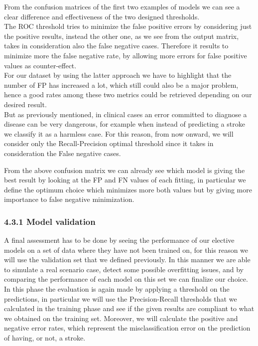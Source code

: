 \documentclass[
]{article}
\begin{document}
From the confusion matrices of the first two examples of models we can
see a clear difference and effectiveness of the two designed
thresholds.\\
The ROC threshold tries to minimize the false positive errors by
considering just the positive results, instead the other one, as we see
from the output matrix, takes in consideration also the false negative
cases. Therefore it results to minimize more the false negative rate, by
allowing more errors for false positive values as counter-effect.\\
For our dataset by using the latter approach we have to highlight that
the number of FP has increased a lot, which still could also be a major
problem, hence a good rates among these two metrics could be retrieved
depending on our desired result.\\
But as previously mentioned, in clinical cases an error committed to
diagnose a disease can be very dangerous, for example when instead of
predicting a stroke we classify it as a harmless case. For this reason,
from now onward, we will consider only the Recall-Precision optimal
threshold since it takes in consideration the False negative cases.

From the above confusion matrix we can already see which model is giving
the best result by looking at the FP and FN values of each fitting, in
particular we define the optimum choice which minimizes more both values
but by giving more importance to false negative minimization.

\hypertarget{model-validation}{%
\subsubsection{4.3.1 Model validation}\label{model-validation}}

A final assessment has to be done by seeing the performance of our
elective models on a set of data where they have not been trained on,
for this reason we will use the validation set that we defined
previously. In this manner we are able to simulate a real scenario case,
detect some possible overfitting issues, and by comparing the
performance of each model on this set we can finalize our choice.\\
In this phase the evaluation is again made by applying a threshold on
the predictions, in particular we will use the Precision-Recall
thresholds that we calculated in the training phase and see if the given
results are compliant to what we obtained on the training set. Moreover,
we will calculate the positive and negative error rates, which represent
the misclassification error on the prediction of having, or not, a
stroke.
\end{document}
